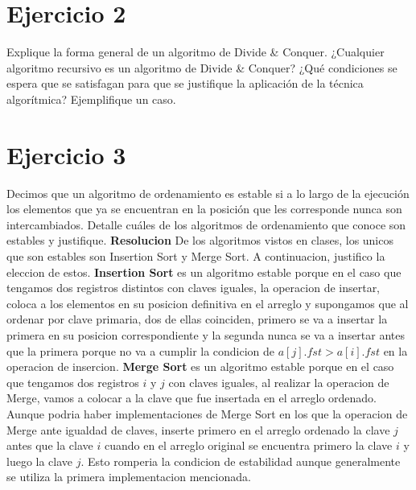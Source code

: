\documentclass[10pt,a4paper]{article}
\begin{document}
\section{Ejercicio 2}

Explique la forma general de un algoritmo de Divide \& Conquer. ¿Cualquier algoritmo recursivo es un algoritmo de Divide \& Conquer? ¿Qué condiciones se espera que se satisfagan para que se justifique la aplicación de la técnica algorítmica? Ejemplifique un caso.
\newpage

\section{Ejercicio 3}

Decimos que un algoritmo de ordenamiento es estable si a lo largo de la ejecución los elementos que ya se encuentran en la posición que les corresponde nunca son intercambiados. Detalle cuáles de los algoritmos de ordenamiento que conoce son estables y justifique.
\newline
\newline
\textbf{Resolucion}
\newline
\newline
De los algoritmos vistos en clases, los unicos que son estables son Insertion Sort y Merge Sort. A continuacion, justifico la eleccion de estos.
\newline
\newline
\textbf{Insertion Sort} es un algoritmo estable porque en el caso que tengamos dos registros distintos con claves iguales, la operacion de insertar, coloca a los elementos en su posicion definitiva en el arreglo y supongamos que al ordenar por clave primaria, dos de ellas coinciden, primero se va a insertar la primera en su posicion correspondiente y la segunda nunca se va a insertar antes que la primera porque no va a cumplir la condicion de $a[j].fst > a[i].fst$ en la operacion de insercion. 
\newline
\newline
\textbf{Merge Sort} es un algoritmo estable porque en el caso que tengamos dos registros $i$ y $j$ con claves iguales, al realizar la operacion de Merge, vamos a colocar a la clave que fue insertada en el arreglo ordenado. Aunque podria haber implementaciones de Merge Sort en los que la operacion de Merge ante igualdad de claves, inserte primero en el arreglo ordenado la clave $j$ antes que la clave $i$ cuando en el arreglo original se encuentra primero la clave $i$ y luego la clave $j$. Esto romperia la condicion de estabilidad aunque generalmente se utiliza la primera implementacion mencionada.
\newpage
\end{document}
